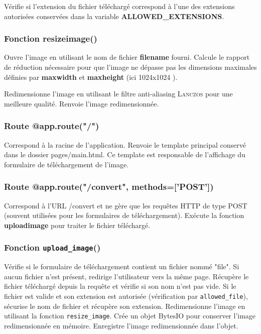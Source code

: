         Vérifie si l'extension du fichier téléchargé correspond à l'une des extensions autorisées conservées dans la variable \textbf{ALLOWED\_EXTENSIONS}.
        
        \subsubsection{Fonction \textbf{resize}\textunderscore\textbf{image}()}
        
        Ouvre l'image en utilisant le nom de fichier \textbf{filename} fourni. Calcule le rapport de réduction nécessaire pour que l'image ne dépasse pas les dimensions maximales définies par \textbf{max}\textunderscore\textbf{width} et \textbf{max}\textunderscore\textbf{height} (ici 1024x1024 ).
        
        Redimensionne l'image en utilisant le filtre anti-aliasing \textsc{Lanczos} pour une meilleure qualité.
        Renvoie l'image redimensionnée.

        \subsubsection{Route @app.route("/")}

        Correspond à la racine de l'application.
        Renvoie le template \html principal conservé dans le dossier pages/main.html. Ce template est responsable de l'affichage du formulaire de téléchargement de l'image.

        \subsubsection{Route @app.route("/convert", methods=['POST'])}

        Correspond à l'URL /convert et ne gère que les requêtes \textsc{HTTP} de type POST (souvent utilisées pour les formulaires de téléchargement).
        Exécute la fonction \textbf{upload}\textunderscore\textbf{image} pour traiter le fichier téléchargé.
        
        \subsubsection{Fonction \texttt{upload\_image}()}
        
        Vérifie si le formulaire de téléchargement contient un fichier nommé "file". Si aucun fichier n'est présent, redirige l'utilisateur vers la même page.
        Récupère le fichier téléchargé depuis la requête et vérifie si son nom n'est pas vide. 
        Si le fichier est valide et son extension est autorisée (vérification par \texttt{allowed\_file}), sécurise le nom de fichier et récupère son extension.
        Redimensionne l'image en utilisant la fonction \texttt{resize\_image}.
        Crée un objet BytesIO pour conserver l'image redimensionnée en mémoire.
        Enregistre l'image redimensionnée dans l'objet.
        

